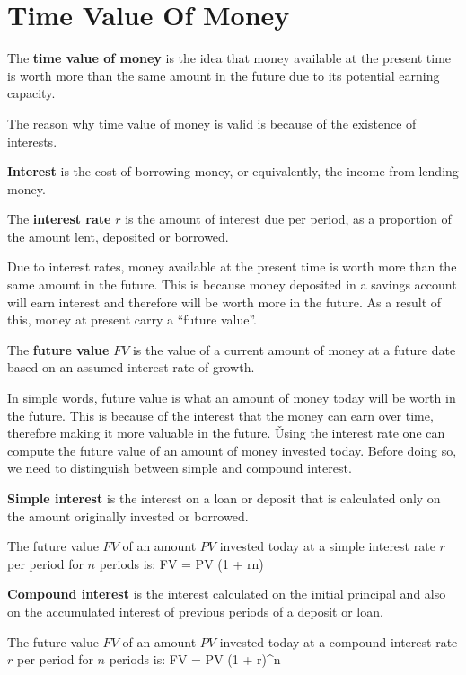 \section{Time Value Of Money}

The \textbf{time value of money} is the idea that money available at the present time is worth more than the same
amount in the future due to its potential earning capacity.
\ed

The reason why time value of money is valid is because of the existence of interests.

\bd[Interest]
\textbf{Interest} is the cost of borrowing money, or equivalently, the income from lending money.
\ed

The \textbf{interest rate} $r$ is the amount of interest due per period, as a proportion of the amount lent, deposited
or borrowed.
\ed

Due to interest rates, money available at the present time is worth more than the same amount in the future. This is
because money deposited in a savings account will earn interest and therefore will be worth more in the future. As a
result of this, money at present carry a ``future value''.

The \textbf{future value} $FV$ is the value of a current amount of money at a future date based on an assumed interest
rate of growth.
\ed

In simple words, future value is what an amount of money today will be worth in the future. This is because of the
interest that the money can earn over time, therefore making it more valuable in the future. \v

Using the interest rate one can compute the future value of an amount of money invested today. Before doing so, we
need to distinguish between simple and compound interest.

\textbf{Simple interest} is the interest on a loan or deposit that is calculated only on the amount originally
invested or borrowed.
\ed

The future value $FV$ of an amount $PV$ invested today at a simple interest rate $r$ per period for $n$ periods is:
\bse
FV = PV \cdot (1 + rn)
\ese

\textbf{Compound interest} is the interest calculated on the initial principal and also on the accumulated interest
of previous periods of a deposit or loan.
\ed

The future value $FV$ of an amount $PV$ invested today at a compound interest rate $r$ per period for $n$ periods is:
\bse
FV = PV \cdot (1 + r)^n
\ese

